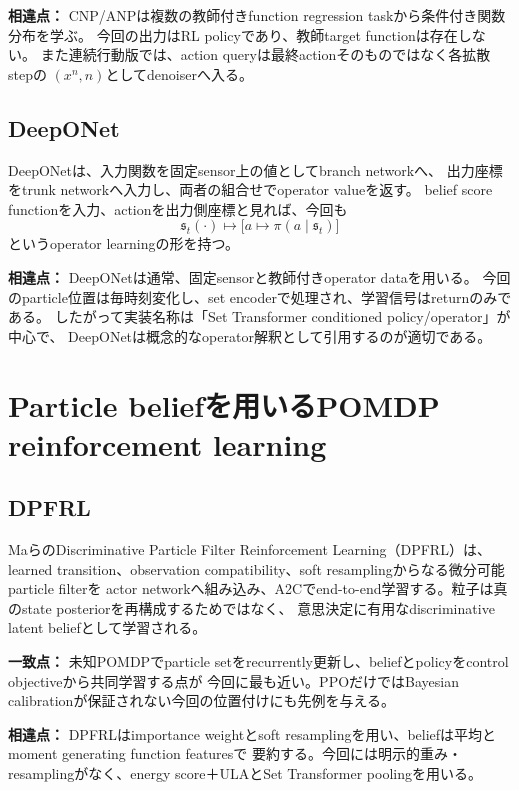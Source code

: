 \documentclass[a4paper,11pt]{article}
\newcommand{\matchpoint}{\par\noindent\textbf{一致点：}}
\newcommand{\difference}{\par\noindent\textbf{相違点：}}
\begin{document}
\difference
CNP/ANPは複数の教師付きfunction regression taskから条件付き関数分布を学ぶ。
今回の出力はRL policyであり、教師target functionは存在しない。
また連続行動版では、action queryは最終actionそのものではなく各拡散stepの
$(x^n,n)$としてdenoiserへ入る。

\subsection{DeepONet}

DeepONet\cite{lu2021deeponet}は、入力関数を固定sensor上の値としてbranch networkへ、
出力座標をtrunk networkへ入力し、両者の組合せでoperator valueを返す。
belief score functionを入力、actionを出力側座標と見れば、今回も
\begin{equation}
  \mathfrak{s}_t(\cdot)\longmapsto
  \bigl[a\mapsto\pi(a\mid\mathfrak{s}_t)\bigr]
  \label{eq:operator-view}
\end{equation}
というoperator learningの形を持つ。

\difference
DeepONetは通常、固定sensorと教師付きoperator dataを用いる。
今回のparticle位置は毎時刻変化し、set encoderで処理され、学習信号はreturnのみである。
したがって実装名称は「Set Transformer conditioned policy/operator」が中心で、
DeepONetは概念的なoperator解釈として引用するのが適切である。

\section{Particle beliefを用いるPOMDP reinforcement learning}

\subsection{DPFRL}

MaらのDiscriminative Particle Filter Reinforcement Learning（DPFRL）\cite{ma2020dpfrl}は、
learned transition、observation compatibility、soft resamplingからなる微分可能particle filterを
actor networkへ組み込み、A2Cでend-to-end学習する。粒子は真のstate posteriorを再構成するためではなく、
意思決定に有用なdiscriminative latent beliefとして学習される。

\matchpoint
未知POMDPでparticle setをrecurrently更新し、beliefとpolicyをcontrol objectiveから共同学習する点が
今回に最も近い。PPOだけではBayesian calibrationが保証されない今回の位置付けにも先例を与える。

\difference
DPFRLはimportance weightとsoft resamplingを用い、beliefは平均とmoment generating function featuresで
要約する。今回には明示的重み・resamplingがなく、energy score＋ULAとSet Transformer poolingを用いる。
\end{document}
